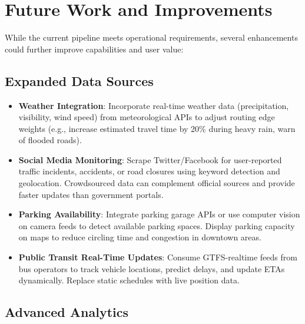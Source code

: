 \section{Future Work and Improvements}

While the current pipeline meets operational requirements, several enhancements could further improve capabilities and user value:

\subsection{Expanded Data Sources}

\begin{itemize}
    \item \textbf{Weather Integration}: Incorporate real-time weather data (precipitation, visibility, wind speed) from meteorological APIs to adjust routing edge weights (e.g., increase estimated travel time by 20\% during heavy rain, warn of flooded roads).
    
    \item \textbf{Social Media Monitoring}: Scrape Twitter/Facebook for user-reported traffic incidents, accidents, or road closures using keyword detection and geolocation. Crowdsourced data can complement official sources and provide faster updates than government portals.
    
    \item \textbf{Parking Availability}: Integrate parking garage APIs or use computer vision on camera feeds to detect available parking spaces. Display parking capacity on maps to reduce circling time and congestion in downtown areas.
    
    \item \textbf{Public Transit Real-Time Updates}: Consume GTFS-realtime feeds from bus operators to track vehicle locations, predict delays, and update ETAs dynamically. Replace static schedules with live position data.
\end{itemize}

\subsection{Advanced Analytics}

